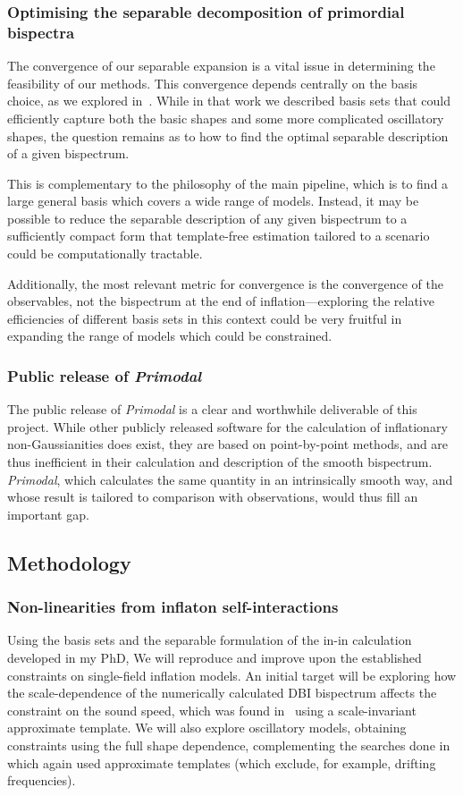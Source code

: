 \subsubsection*{Optimising the separable decomposition of primordial bispectra}
The convergence of our separable expansion is a vital issue in determining the feasibility of our methods.
This convergence depends centrally on the basis choice, as we explored in~\cite{probing_precision}.
While in that work we described basis sets that could efficiently capture both the
basic shapes and some more complicated oscillatory shapes,
the question remains as to how to find the optimal separable description of a given bispectrum.

This is complementary to the philosophy of the main pipeline,
which is to find a large general basis which covers a wide range of models.
Instead, it may be possible to reduce the separable description of any given
bispectrum to a sufficiently compact form that template-free estimation
tailored to a scenario could be computationally tractable.

Additionally, the most relevant metric for convergence is the convergence of
the observables, not the bispectrum at the end of inflation---exploring the
relative efficiencies of different basis sets in this context could be very
fruitful in expanding the range of models which could be constrained.

\subsubsection*{Public release of \textit{Primodal}}
The public release of \textit{Primodal} is a clear and worthwhile
deliverable of this project. While other publicly released software
for the calculation of inflationary non-Gaussianities does exist,
they are based on point-by-point methods, and are thus inefficient
in their calculation and description of the smooth bispectrum.
\textit{Primodal}, which calculates the same quantity in an intrinsically
smooth way, and whose result is tailored to comparison with observations,
would thus fill an important gap.

\subsection*{Methodology}
\subsubsection*{Non-linearities from inflaton self-interactions}
Using the basis sets and the separable formulation of the in-in calculation developed in my PhD,
We will reproduce and improve upon the established constraints on single-field inflation models.
An initial target will be exploring how the scale-dependence of the numerically calculated DBI bispectrum
affects the constraint on the sound speed, which was found in~\cite{Planck_NG_2018}
using a scale-invariant approximate template. We will also explore oscillatory models,
obtaining constraints using the full shape dependence, complementing the
searches done in~\cite{Planck_NG_2018} which again used approximate templates
(which exclude, for example, drifting frequencies).

